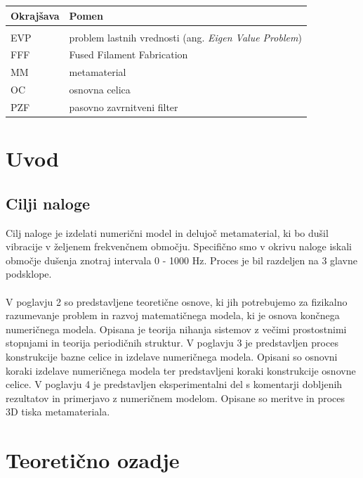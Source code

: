 \documentclass[12pt]{report}
\begin{document}

\begin{longtable}[l]{@{}p{}@{}p{}@{}}
\hline
Okrajšava & Pomen\\
\hline
\endfirsthead
\hline
\endhead
&\\
EVP & problem lastnih vrednosti (ang. \emph{Eigen Value Problem})\\
FFF & Fused Filament Fabrication \\
MM & metamaterial\\
OC & osnovna celica\\
PZF & pasovno zavrnitveni filter\\
\end{longtable}

\pagestyle{fancy}

\chapter{Uvod}
\section{Cilji naloge}

Cilj naloge je izdelati numerični model in delujoč metamaterial, ki bo dušil vibracije
v željenem frekvenčnem območju. Specifično smo v okrivu naloge iskali območje dušenja
znotraj intervala 0 - 1000 Hz. Proces je bil razdeljen na 3 glavne podsklope.
\\
\\
V poglavju 2 so predstavljene teoretične osnove, ki jih potrebujemo za fizikalno razumevanje
problem in razvoj matematičnega modela, ki je osnova končnega numeričnega modela. Opisana je 
teorija nihanja sistemov z večimi prostostnimi stopnjami in teorija periodičnih struktur.
V poglavju 3 je predstavljen proces konstrukcije bazne celice in izdelave numeričnega modela. 
Opisani so osnovni koraki izdelave numeričnega modela ter predstavljeni koraki konstrukcije
osnovne celice.
V poglavju 4 je predstavljen eksperimentalni del s komentarji dobljenih rezultatov in primerjavo
z numeričnem modelom. Opisane so meritve in proces 3D tiska metamateriala.

\chapter{Teoretično ozadje}
\end{document}
